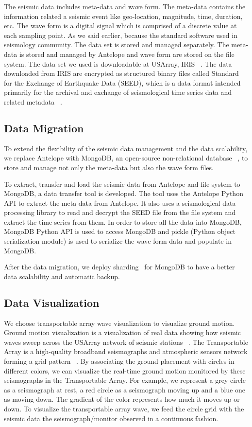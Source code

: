 \documentclass[9pt,twocolumn,twoside]{../../styles/osajnl}
\begin{document}
The seismic data includes meta-data and wave form. The meta-data contains the information related a seismic event like geo-location, magnitude, time, duration, etc. The wave form is a digital signal which is comprised of a discrete value at each sampling point. As we said earlier, because the standard software used in seismology community. The data set is stored and managed separately. The meta-data is stored and managed by Antelope and wave form are stored on the file system. The data set we used is downloadable at USArray, IRIS ~\cite{www-datairis}. The data downloaded from IRIS are encrypted as structured binary files called Standard for the Exchange of Earthquake Data (SEED), which is a data format intended primarily for the archival and exchange of seismological time series data and related metadata ~\cite{www-seed}.

\subsection{Data Migration}

To extend the flexibility of the seismic data management and the data scalability, we replace Antelope with MongoDB, an open-source non-relational database ~\cite{www-mongodb}, to store and manage not only the meta-data but also the wave form files.

To extract, transfer and load the seismic data from Antelope and file system to MongoDB, a data transfer tool is developed. The tool uses the Antelope Python API to extract the meta-data from Antelope. It also uses a seismological data processing library to read and decrypt the SEED file from the file system and extract the time series from them. In order to store all the data into MongoDB, MongoDB Python API is used to access MongoDB and pickle (Python object serialization module) is used to serialize the wave form data and populate in MongoDB.

After the data migration, we deploy sharding~\cite{www-shard} for MongoDB to have a better data scalability and automatic backup.


\subsection{Data Visualization}

We choose transportable array wave visualization to visualize ground motion. Ground motion visualization is a visualization of real data showing how seismic waves sweep across the USArray network of seismic stations ~\cite{www-usagmv}. The Transportable Array is a high-quality broadband seismographs and atmospheric sensors network forming a grid pattern ~\cite{www-transarray}. By associating the ground placement with circles in different colors, we can visualize the real-time ground motion monitored by these seismographs in the Transportable Array. For example, we represent a grey circle as a seismograph at rest, a red circle as a seismograph moving up and a blue one as moving down. The gradient of the color represents how much it moves up or down. To visualize the transportable array wave, we feed the circle grid with the seismic data the seismograph/monitor observed in a continuous fashion.
\end{document}
